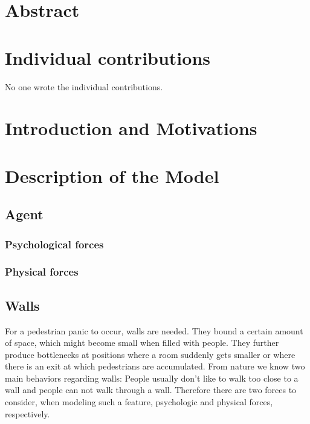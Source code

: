 \documentclass[11pt]{article}
\begin{document}
\tableofcontents

\newpage




\section{Abstract}



\section{Individual contributions}
No one wrote the individual contributions.

\section{Introduction and Motivations}

\section{Description of the Model}

\subsection{Agent}
\subsubsection{Psychological forces}

\subsubsection{Physical forces}


\subsection{Walls}

For a pedestrian panic to occur, walls are needed. They bound a certain amount of space, which might become small when filled with people. They further produce bottlenecks at positions where a room suddenly gets smaller or where there is an exit at which pedestrians are accumulated. From nature we know two main behaviors regarding walls: People usually don't like to walk too close to a wall and people can not walk through a wall. Therefore there are two forces to consider, when modeling such a feature, psychologic and physical forces, respectively.
\end{document}
